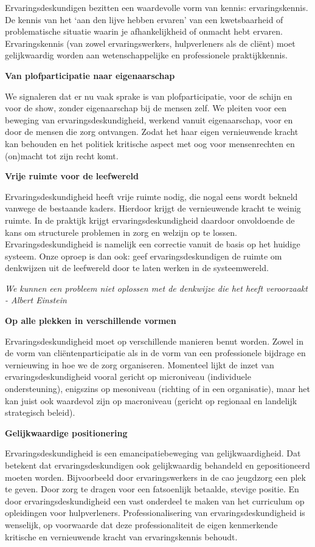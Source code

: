 Ervaringsdeskundigen bezitten een waardevolle vorm van kennis:
ervaringskennis. De kennis van het `aan den lijve hebben ervaren' van
een kwetsbaarheid of problematische situatie waarin je afhankelijkheid
of onmacht hebt ervaren. Ervaringskennis (van zowel ervaringswerkers,
hulpverleners als de cliënt) moet gelijkwaardig worden aan
wetenschappelijke en professionele praktijkkennis.

\textbf{Van plofparticipatie naar eigenaarschap}

We signaleren dat er nu vaak sprake is van plofparticipatie, voor de
schijn en voor de show, zonder eigenaarschap bij de mensen zelf. We
pleiten voor een beweging van ervaringsdeskundigheid, werkend vanuit
eigenaarschap, voor en door de mensen die zorg ontvangen. Zodat het haar
eigen vernieuwende kracht kan behouden en het politiek kritische aspect
met oog voor mensenrechten en (on)macht tot zijn recht komt.

\textbf{Vrije ruimte voor de leefwereld}

Ervaringsdeskundigheid heeft vrije ruimte nodig, die nogal eens wordt
bekneld vanwege de bestaande kaders. Hierdoor krijgt de vernieuwende
kracht te weinig ruimte. In de praktijk krijgt ervaringsdeskundigheid
daardoor onvoldoende de kans om structurele problemen in zorg en welzijn
op te lossen. Ervaringsdeskundigheid is namelijk een correctie vanuit de
basis op het huidige systeem. Onze oproep is dan ook: geef
ervaringsdeskundigen de ruimte om denkwijzen uit de leefwereld door te
laten werken in de systeemwereld.

\emph{We kunnen een probleem niet oplossen met de denkwijze die het
heeft veroorzaakt - Albert Einstein}

\textbf{Op alle plekken in verschillende vormen}

Ervaringsdeskundigheid moet op verschillende manieren benut worden.
Zowel in de vorm van cliëntenparticipatie als in de vorm van een
professionele bijdrage en vernieuwing in hoe we de zorg organiseren.
Momenteel lijkt de inzet van ervaringsdeskundigheid vooral gericht op
microniveau (individuele ondersteuning), enigszins op mesoniveau
(richting of in een organisatie), maar het kan juist ook waardevol zijn
op macroniveau (gericht op regionaal en landelijk strategisch beleid).

\textbf{Gelijkwaardige positionering}

Ervaringsdeskundigheid is een emancipatiebeweging van gelijkwaardigheid.
Dat betekent dat ervaringsdeskundigen ook gelijkwaardig behandeld en
gepositioneerd moeten worden. Bijvoorbeeld door ervaringswerkers in de
cao jeugdzorg een plek te geven. Door zorg te dragen voor een
fatsoenlijk betaalde, stevige positie. En door ervaringsdeskundigheid
een vast onderdeel te maken van het curriculum op opleidingen voor
hulpverleners. Professionalisering van ervaringsdeskundigheid is
wenselijk, op voorwaarde dat deze professionaliteit de eigen kenmerkende
kritische en vernieuwende kracht van ervaringskennis behoudt.

